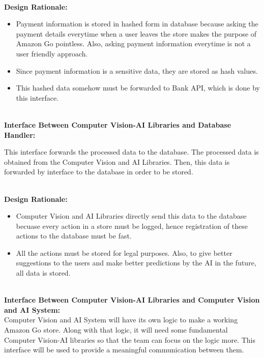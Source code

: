 \documentclass[11pt]{article}
\begin{document}
    \textbf{\\Design Rationale:}
    \begin{itemize}
       \item Payment information is stored in hashed form in database because asking the payment details everytime when a user leaves the store makes the purpose of Amazon Go pointless. Also, asking payment 
       information everytime is not a user friendly approach. 
       \item Since payment information is a sensitive data, they are stored as hash values.
       \item This hashed data somehow must be forwarded to Bank API, which is done by this interface. 
    \end{itemize}

    \textbf{\\Interface Between Computer Vision-AI Libraries and Database Handler:\\}

    This interface forwards the processed data to the database. 
    The processed data is obtained from the Computer Vision and AI Libraries. 
    Then, this data is forwarded by interface to the database in order to be stored. 
    
    \textbf{\\Design Rationale:}
    \begin{itemize}
       \item Computer Vision and AI Libraries directly send this data to the database becuase every action in a store must be logged, hence registration of these actions to the database must be fast. 
       
       \item All the actions must be stored for legal purposes. Also, to give better suggestions to the users and make better predictions by the AI in the future, all data is stored. 
    
    \end{itemize}

    \textbf{\\Interface Between Computer Vision-AI Libraries and Computer Vision and AI System:\\}
    Computer Vision and AI System will have its own logic to make a working Amazon Go store. Along with that logic, it will need some fundamental Computer Vision-AI libraries so that the team can
    focus on the logic more. This interface will be used to provide a meaningful communication between them.
\end{document}
